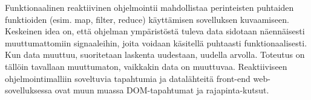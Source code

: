 Funktionaalinen reaktiivinen ohjelmointii mahdollistaa perinteisten puhtaiden funktioiden (esim. map, filter, reduce)
käyttämisen sovelluksen kuvaamiseen. Keskeinen idea on, että ohjelman ympäristöstä tuleva data sidotaan näennäisesti
muuttumattomiin signaaleihin, joita voidaan käsitellä puhtaasti funktionaalisesti. Kun data muuttuu, suoritetaan
laskenta uudestaan, uudella arvolla. Toteutus on tällöin tavallaan muuttumaton, vaikkakin data on muuttuvaa.
Reaktiiviseen ohjelmointimalliin soveltuvia tapahtumia ja datalähteitä front-end web-sovelluksessa ovat muun muassa
DOM-tapahtumat ja rajapinta-kutsut. \cite{elmlang}